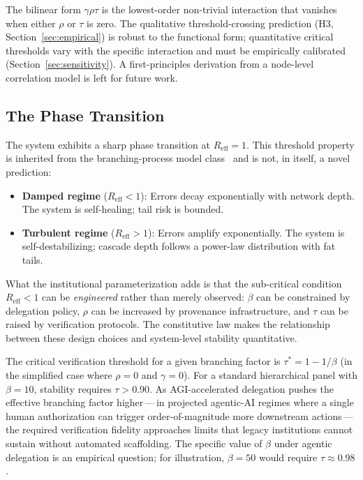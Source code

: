 \documentclass[runningheads]{llncs}
\begin{document}
The bilinear form $\gamma\rho\tau$ is the lowest-order non-trivial interaction that vanishes when either $\rho$ or $\tau$ is zero. The qualitative threshold-crossing prediction (H3, Section~\ref{sec:empirical}) is robust to the functional form; quantitative critical thresholds vary with the specific interaction and must be empirically calibrated (Section~\ref{sec:sensitivity}). A first-principles derivation from a node-level correlation model is left for future work.

\subsection{The Phase Transition}

The system exhibits a sharp phase transition at $R_{\mathrm{eff}} = 1$. This threshold property is inherited from the branching-process model class~\cite{anderson1991infectious,hethcote2000mathematics} and is not, in itself, a novel prediction:

\begin{itemize}
\item \textbf{Damped regime} ($R_{\mathrm{eff}} < 1$): Errors decay exponentially with network depth. The system is self-healing; tail risk is bounded.
\item \textbf{Turbulent regime} ($R_{\mathrm{eff}} > 1$): Errors amplify exponentially. The system is self-destabilizing; cascade depth follows a power-law distribution with fat tails.
\end{itemize}

What the institutional parameterization adds is that the sub-critical condition $R_{\mathrm{eff}} < 1$ can be \emph{engineered} rather than merely observed: $\beta$ can be constrained by delegation policy, $\rho$ can be increased by provenance infrastructure, and $\tau$ can be raised by verification protocols. The constitutive law makes the relationship between these design choices and system-level stability quantitative.

The critical verification threshold for a given branching factor is $\tau^* = 1 - 1/\beta$ (in the simplified case where $\rho = 0$ and $\gamma = 0$). For a standard hierarchical panel with $\beta = 10$, stability requires $\tau > 0.90$. As AGI-accelerated delegation pushes the effective branching factor higher\,---\,in projected agentic-AI regimes where a single human authorization can trigger order-of-magnitude more downstream actions\,---\,the required verification fidelity approaches limits that legacy institutions cannot sustain without automated scaffolding. The specific value of $\beta$ under agentic delegation is an empirical question; for illustration, $\beta = 50$ would require $\tau \approx 0.98$.
\end{document}
